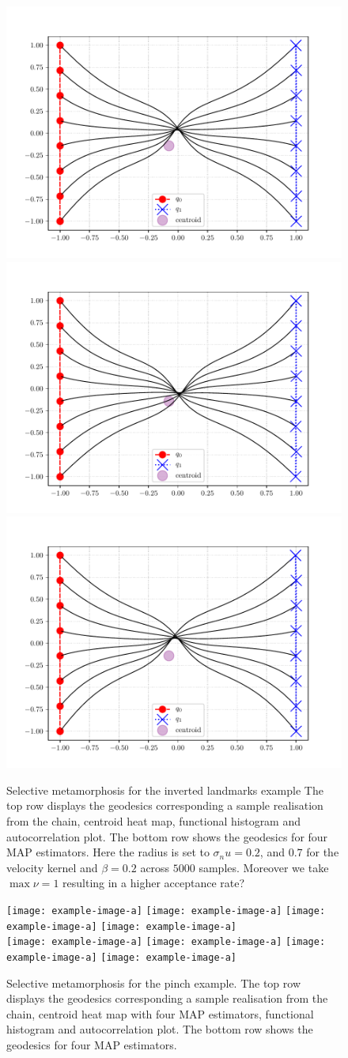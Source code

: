 \documentclass[runningheads]{llncs}
\begin{document}
\begin{figure}
\begin{minipage}{\textwidth}
    \includegraphics[width=.23\textwidth]{../results/results_criss_cross/MAP_center_1.pdf}
    \includegraphics[width=.23\textwidth]{../results/results_criss_cross/MAP_center_2.pdf}
    \includegraphics[width=.23\textwidth]{../results/results_criss_cross/MAP_center_3.pdf}
    \caption{Selective metamorphosis for the inverted landmarks example The top
    row displays the geodesics corresponding a sample realisation from the
    chain, centroid heat map, functional histogram and
    autocorrelation plot. The bottom row shows the geodesics for four MAP
    estimators. Here the radius is set to $\sigma_nu = 0.2$, and $0.7$ for the
    velocity kernel and $\beta=0.2$ across $5000$ samples. Moreover we take
    $\max\nu = 1$ resulting in a higher acceptance rate?}
    \label{fig:selective:crisscross}
\end{minipage}
\end{figure}
\begin{figure}
\centering
\begin{minipage}{\textwidth}
  \centering
    \texttt{[image: example-image-a]}
    \texttt{[image: example-image-a]}
    \texttt{[image: example-image-a]}
    \texttt{[image: example-image-a]}\\[0.25cm]
    \texttt{[image: example-image-a]}
    \texttt{[image: example-image-a]}
    \texttt{[image: example-image-a]}
    \texttt{[image: example-image-a]}
    \caption{Selective metamorphosis for the pinch example. The top row displays
    the geodesics corresponding a sample realisation from the chain, centroid
    heat map with four MAP estimators, functional histogram and autocorrelation
    plot. The bottom row shows the geodesics for four MAP estimators.}
    \label{fig:selective:pinch}
\end{minipage}
\end{figure}
\end{document}
